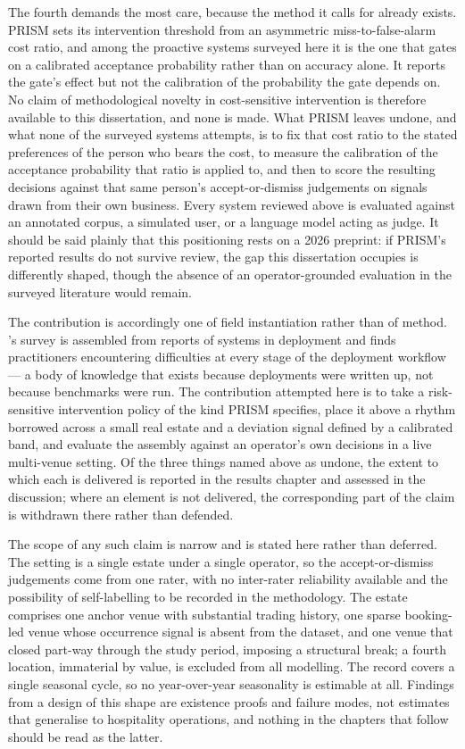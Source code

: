 The fourth demands the most care, because the method it calls for already
exists. PRISM \citep{fu_prism_2026} sets its intervention threshold from an
asymmetric miss-to-false-alarm cost ratio, and among the proactive systems
surveyed here it is the one that gates on a calibrated acceptance probability
rather than on accuracy alone. It reports the gate's effect but not the
calibration of the probability the gate depends on. No claim of methodological
novelty in cost-sensitive intervention is therefore available to this
dissertation, and none is made. What PRISM leaves undone, and what none of the
surveyed systems attempts, is to fix that cost ratio to the stated preferences
of the person who bears the cost, to measure the calibration of the acceptance
probability that ratio is applied to, and then to score the resulting decisions
against that same person's accept-or-dismiss judgements on signals drawn from
their own business. Every system reviewed above is evaluated against an
annotated corpus, a simulated user, or a language model acting as judge. It
should be said plainly that this positioning rests on a 2026 preprint: if
PRISM's reported results do not survive review, the gap this dissertation
occupies is differently shaped, though the absence of an operator-grounded
evaluation in the surveyed literature would remain.

The contribution is accordingly one of field instantiation rather than of
method. \citet{paleyes_challenges_2022}'s survey is assembled from reports of
systems in deployment and finds practitioners encountering difficulties at
every stage of the deployment workflow --- a body of knowledge that exists
because deployments were written up, not because benchmarks were run. The
contribution attempted here is to take a risk-sensitive intervention policy of
the kind PRISM specifies, place it above a rhythm borrowed across a small real
estate and a deviation signal defined by a calibrated band, and evaluate the
assembly against an operator's own decisions in a live multi-venue setting. Of
the three things named above as undone, the extent to which each is delivered
is reported in the results chapter and assessed in the discussion; where an
element is not delivered, the corresponding part of the claim is withdrawn
there rather than defended.

The scope of any such claim is narrow and is stated here rather than deferred.
The setting is a single estate under a single operator, so the accept-or-dismiss
judgements come from one rater, with no inter-rater reliability available and
the possibility of self-labelling to be recorded in the methodology. The estate
comprises one anchor venue with substantial trading history, one sparse
booking-led venue whose occurrence signal is absent from the dataset, and one
venue that closed part-way through the study period, imposing a structural
break; a fourth location, immaterial by value, is excluded from all modelling.
The record covers a single seasonal cycle, so no year-over-year seasonality is
estimable at all. Findings from a design of this shape are existence proofs and
failure modes, not estimates that generalise to hospitality operations, and
nothing in the chapters that follow should be read as the latter.

